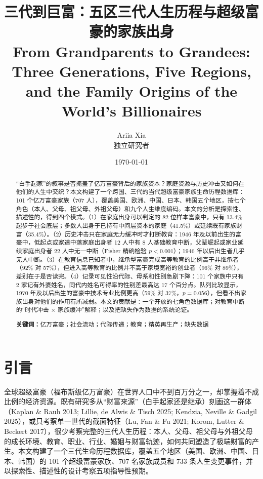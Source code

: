 \documentclass[UTF8,a4paper,11pt]{ctexart}
\title{三代到巨富：五区三代人生历程与超级富豪的家族出身\\[6pt]\large From Grandparents to Grandees: Three Generations, Five Regions, and the Family Origins of the World's Billionaires}
\author{Ariia Xia\\[2pt]\small 独立研究者}
\date{\today}
\begin{document}
\maketitle

\begin{abstract}
“白手起家”的叙事是否掩盖了亿万富豪背后的家族资本？家庭资源与历史冲击又如何在他们的人生中交织？本文构建了一个跨国、三代的当代超级富豪家族生命历程数据库：101 个亿万富豪家族（707 人），覆盖美国、欧洲、中国、日本、韩国五个地区，按七个角色（本人、父母、祖父母、外祖父母）和九个人生维度编码。本文的分析是探索性、描述性的，得到四个模式。（1）在家庭出身可以判定的 82 位样本富豪中，只有 13.4\% 起步于社会底层；多数人出身于已持有中间层资本的家庭（41.5\%）或延续既有家族财富（35.4\%）。（2）历史冲击只在家庭无力缓冲时才打断教育：1946 年及以前出生的富豪中，低起点或家道中落家庭出身者 12 人中有 8 人基础教育中断，父辈崛起或家业延续家庭出身者 22 人中无一中断（Fisher 精确检验 $p<0.001$）；1946 年以后出生者几乎无人中断。（3）在教育信息已知者中，继承型富豪完成高等教育的比例高于非继承者（92\% 对 57\%），但进入高等教育的比例并不高于家境宽裕的创业者（96\% 对 89\%），差别在于是否读完。（4）记录可见性沿代际、母系和性别急剧下降：101 个家族中只有 2 家记有外婆姓名，同代内姓名可得率的性别差最高达 17 个百分点。队列比较显示，1970 年及以后出生的富豪中技术专业比例更高（59\% 对 37\%，$p=0.056$），但看不出家族出身对他们的作用有所减弱。本文的贡献是：一个开放的七角色数据库；对教育中断的“时代冲击 × 家族缓冲”解释；以及把缺失作为数据的系统论证。

\medskip
\noindent\textbf{关键词：}亿万富豪；社会流动；代际传递；教育；精英再生产；缺失数据
\end{abstract}

\section{引言}
\label{sec:intro}

全球超级富豪（福布斯级亿万富豪）在世界人口中不到百万分之一，却掌握着不成比例的经济资源。既有研究多从“财富来源”（白手起家还是继承）刻画这一群体（Kaplan \& Rauh 2013; Lillie, de Alwis \& Tisch 2025; Kendzia, Neville \& Gadgil 2025），或只考察单一世代的截面特征（Lu, Fan \& Fu 2021; Korom, Lutter \& Beckert 2017），很少考察完整的三代人生历程：本人、父母、祖父母与外祖父母的成长环境、教育、职业、行业、婚姻与财富轨迹，如何共同塑造了极端财富的产生。本文构建了一个三代生命历程数据库，覆盖五个地区（美国、欧洲、中国、日本、韩国）的 101 个超级富豪家族、707 名家族成员和 733 条人生变更事件，并以探索性、描述性的设计考察五项指导性预期。
\end{document}
